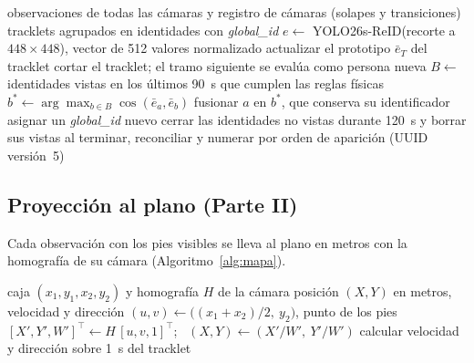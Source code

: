 \documentclass[12pt,a4paper]{article}
\begin{document}
\begin{algorithm}[!ht]
\caption{Asociación multicámara con galería global}
\label{alg:reid}
\begin{algorithmic}[1]
\REQUIRE observaciones de todas las cámaras y registro de cámaras (solapes y transiciones)
\ENSURE tracklets agrupados en identidades con \textit{global\_id}
  \STATE $e \leftarrow$ YOLO26s-ReID(recorte a $448 \times 448$), vector de 512 valores normalizado
  \STATE actualizar el prototipo $\bar{e}_T$ del tracklet
    \STATE cortar el tracklet; el tramo siguiente se evalúa como persona nueva
  \ENDIF
\ENDFOR
{}
  \STATE $B \leftarrow$ identidades vistas en los últimos 90~s que cumplen las reglas físicas
  \STATE $b^{*} \leftarrow \arg\max_{b \in B} \cos(\bar{e}_a, \bar{e}_b)$
    \STATE fusionar $a$ en $b^{*}$, que conserva su identificador
    \STATE asignar un \textit{global\_id} nuevo
  \ENDIF
\ENDFOR
\STATE cerrar las identidades no vistas durante 120~s y borrar sus vistas
\STATE al terminar, reconciliar y numerar por orden de aparición (UUID versión~5)
\end{algorithmic}
\end{algorithm}

\FloatBarrier
\subsection{Proyección al plano (Parte II)}

Cada observación con los pies visibles se lleva al plano en metros con la homografía de su cámara (Algoritmo~\ref{alg:mapa}).

\begin{algorithm}[H]
\caption{Proyección al plano}
\label{alg:mapa}
\begin{algorithmic}[1]
\REQUIRE caja $(x_1,y_1,x_2,y_2)$ y homografía $H$ de la cámara
\ENSURE posición $(X,Y)$ en metros, velocidad y dirección
  \STATE $(u,v) \leftarrow \big((x_1+x_2)/2,\ y_2\big)$, punto de los pies
  \STATE $[X',Y',W']^{\top} \leftarrow H\,[u,v,1]^{\top}$; \ $(X,Y) \leftarrow (X'/W',\ Y'/W')$
  \STATE calcular velocidad y dirección sobre 1~s del tracklet
\ENDIF
\end{algorithmic}
\end{algorithm}
\end{document}
